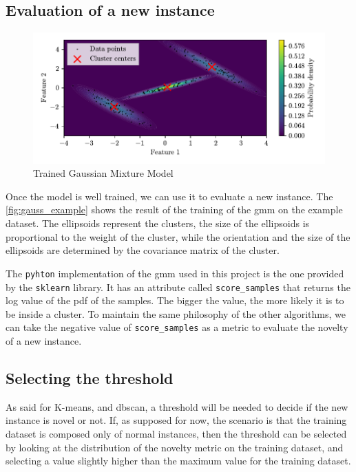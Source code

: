\subsection{Evaluation of a new instance}
\begin{figure}
    \centering
    \includegraphics{images/Gaussian/Figure_2.pdf}
    \caption{Trained Gaussian Mixture Model}
    \label{fig:gauss_example}
\end{figure}
Once the model is well trained, we can use it to evaluate a new instance. The \autoref{fig:gauss_example} shows the result of the training of the \gls{gmm} on the example dataset. The ellipsoids represent the clusters, the size of the ellipsoids is proportional to the weight of the cluster, while the orientation and the size of the ellipsoids are determined by the covariance matrix of the cluster. 

The \texttt{pyhton} implementation of the \gls{gmm} used in this project is the one provided by the \texttt{sklearn} library. It has an attribute called \texttt{score\_samples} that returns the log value of the \gls{pdf} of the samples.
The bigger the value, the more likely it is to be inside a cluster. 
To maintain the same philosophy of the other algorithms, we can take the negative value of \texttt{score\_samples} as a metric to evaluate the novelty of a new instance. 

\subsection{Selecting the threshold}
As said for K-means, and \gls{dbscan}, a threshold will be needed to decide if the new instance is novel or not. If, as supposed for now, the scenario is that the training dataset is composed only of normal instances, then the threshold can be selected by looking at the distribution of the novelty metric on the training dataset, and selecting a value slightly higher than the maximum value for the training dataset.

